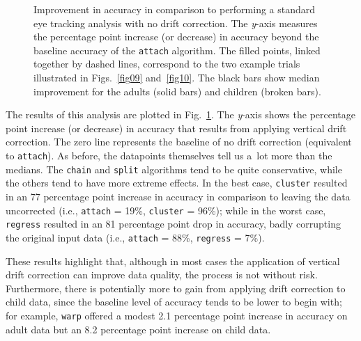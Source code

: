 \documentclass[doc,biblatex]{apa7}
\begin{document}
	\begin{figure}
	\vspace*{2pt}
	\caption{Improvement in accuracy in comparison to performing a standard eye tracking analysis with no drift correction. The \textit{y}-axis measures the percentage point increase (or decrease) in accuracy beyond the baseline accuracy of the \texttt{attach} algorithm. The filled points, linked together by dashed lines, correspond to the two example trials illustrated in Figs.~\ref{fig09} and~\ref{fig10}. The black bars show median improvement for the adults (solid bars) and children (broken bars).}
	\label{fig11}
	\end{figure}

The results of this analysis are plotted in Fig.~\ref{fig11}. The \textit{y}-axis shows the percentage point increase (or decrease) in accuracy that results from applying vertical drift correction. The zero line represents the baseline of no drift correction (equivalent to \texttt{attach}). As before, the datapoints themselves tell us a~lot more than the medians. The \texttt{chain} and \texttt{split} algorithms tend to be quite conservative, while the others tend to have more extreme effects. In the best case, \texttt{cluster} resulted in an 77 percentage point increase in accuracy in comparison to leaving the data uncorrected (i.e., \texttt{attach} = 19\%, \texttt{cluster} = 96\%); while in the worst case, \texttt{regress} resulted in an 81 percentage point drop in accuracy, badly corrupting the original input data (i.e., \texttt{attach} = 88\%, \texttt{regress} = 7\%).

These results highlight that, although in most cases the application of vertical drift correction can improve data quality, the process is not without risk. Furthermore, there is potentially more to gain from applying drift correction to child data, since the baseline level of accuracy tends to be lower to begin with; for example, \texttt{warp} offered a modest 2.1 percentage point increase in accuracy on adult data but an 8.2 percentage point increase on child data.
\end{document}
